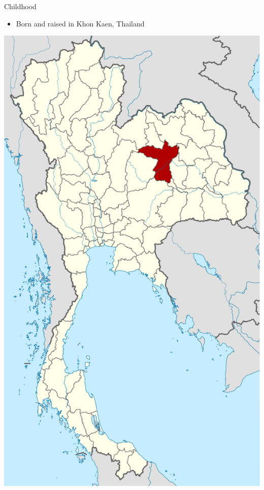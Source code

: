 \documentclass[10pt, svgnames]{beamer}
\begin{document}
\begin{frame}[label={sec:orga5da805}]{Childhood}
\begin{itemize}
\item Born and raised in Khon Kaen, Thailand
\end{itemize}

\begin{center}
\includegraphics[height=0.8\textheight]{pictures/khonkaen.png}
\end{center}
\end{frame}
\end{document}
